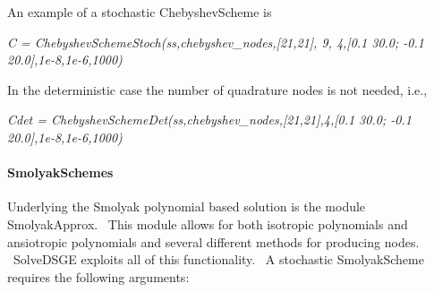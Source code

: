 \documentclass[notitlepage,11pt]{article}
\begin{document}
\bigskip

An example of a stochastic ChebyshevScheme is

\bigskip

\textit{C = ChebyshevSchemeStoch(ss,chebyshev\_nodes,[21,21], 9, 4,[0.1
30.0; -0.1 20.0],1e-8,1e-6,1000)}

\bigskip

In the deterministic case the number of quadrature nodes is not needed, i.e.,

\bigskip

\textit{Cdet = ChebyshevSchemeDet(ss,chebyshev\_nodes,[21,21],4,[0.1 30.0;
-0.1 20.0],1e-8,1e-6,1000)}

\paragraph{SmolyakSchemes}

Underlying the Smolyak polynomial based solution is the module
SmolyakApprox. \ This module allows for both isotropic polynomials and
ansiotropic polynomials and several different methods for producing nodes. \
SolveDSGE exploits all of this functionality. \ A stochastic SmolyakScheme
requires the following arguments:
\end{document}
